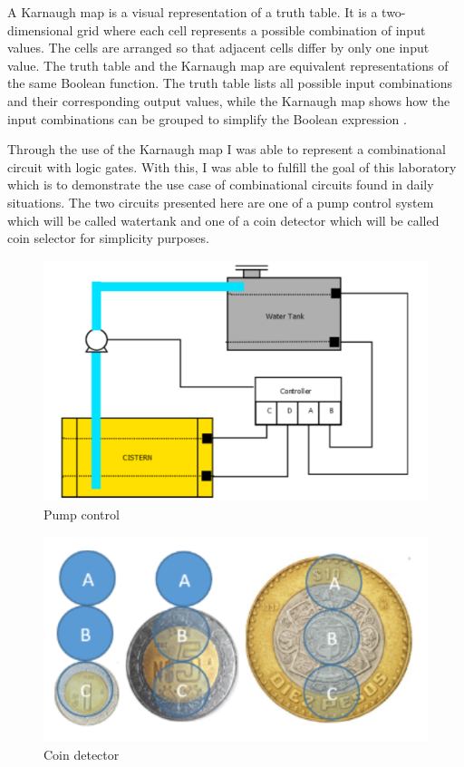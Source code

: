 \documentclass{article}
\begin{document}
\begin{multicols}{2}
	A Karnaugh map is a visual representation of a truth table. It is a two-dimensional grid where each cell represents a possible combination of input values. The cells are arranged so that adjacent cells differ by only one input value. The truth table and the Karnaugh map are equivalent representations of the same Boolean function. The truth table lists all possible input combinations and their corresponding output values, while the Karnaugh map shows how the input combinations can be grouped to simplify the Boolean expression \cite{allaboutcircuits}.

	Through the use of the Karnaugh map I was able to represent a combinational circuit with logic gates. With this, I was able to fulfill the goal of this laboratory which is to demonstrate the use case of combinational circuits found in daily situations. The two circuits presented here are one of a pump control system which will be called watertank and one of a coin detector which will be called coin selector for simplicity purposes.

	\begin{figure}[H]
		\centering
		\includegraphics[width=0.8\linewidth]{images/diagrams/watertank/pump.png}
		\caption{Pump control \cite{Torres}}
		\label{Pump control Diagram}
	\end{figure}

	\begin{figure}[H]
		\centering
		\includegraphics[width=0.8\linewidth]{images/diagrams/coin-selector/coin-detector.png}
		\caption{Coin detector \cite{Torres}}
		\label{Coin detector Diagram}
	\end{figure}


\end{multicols}
\end{document}
